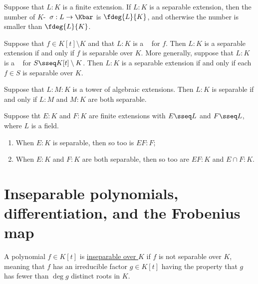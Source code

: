 \documentclass{article}
\begin{document}
  \begin{tcorollary}
    Suppose that \( L:K \) is a finite extension.
    If \( L:K \) is a separable extension, then the number of \( K \)-\homo~\( \sigma:L\to\Kbar \) is \( \fdeg{L}{K} \), and otherwise the number is smaller than \( \fdeg{L}{K} \).
  \end{tcorollary}

  \begin{tcorollary}
    Suppose that \( f\in K[t]\setminus K \) and that \( L:K \) is a \sfe~ for \( f \).
    Then \( L:K \) is a separable extension if and only if \( f \) is separable over \( K \).
    More generally, suppose that \( L:K \) is a \sfe~ for \( S\sseq K[t]\setminus K \).
    Then \( L:K \) is a separable extension if and only if each \( f\in S \) is separable over \( K \).
  \end{tcorollary}

  \begin{ttheorem}
    Suppose that \( L:M:K \) is a tower of algebraic extensions.
    Then \( L:K \) is separable if and only if \( L:M \) and \( M:K \) are both separable.
  \end{ttheorem}

  \begin{ttheorem}
    Suppose tht \( E:K \) and \( F:K \) are finite extensions with \( E\sseq L \) and \( F\sseq L \), where \( L \) is a field.
    \begin{enumerate}[label=(\alph*)]
      \item When \( E:K \) is separable, then so too is \( EF:F \);
      \item When \( E:K \) and \( F:K \) are both separable, then so too are \( EF:K \) and \( E\cap F:K \).
    \end{enumerate}
  \end{ttheorem}

\section{Inseparable polynomials, differentiation, and the Frobenius map}
  \begin{tdefinition}[Inseparable]
    A polynomial \( f \in K[t] \) is \ul{inseparable over \( K \)} if \( f \) is not separable over \( K \), meaning that \( f \) has an irreducible factor \( g \in K[t] \) having the property that \( g \) has fewer than \( \deg g \) distinct roots in \( K \).
  \end{tdefinition}
\end{document}
